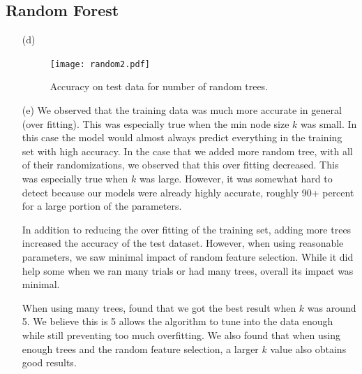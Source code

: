 \documentclass[a4paper]{article}
\begin{document}
\subsection{Random Forest}
\begin{enumerate}
	\item[(d)] $ $
	
	\begin{figure}[H]
		\begin{center}
			\texttt{[image: random2.pdf]}
			\caption{Accuracy on test data for number of random trees.}
		\end{center}
	\end{figure}
	
\item[(e)] We observed that the training data was much more accurate in general (over fitting). This was especially true when the min node size $k$ was small. In this case the model would almost always predict everything in the training set with high accuracy. In the case that we added more random tree, with all of their randomizations, we observed that this over fitting decreased. This was especially true when $k$ was large. However, it was somewhat hard to detect because our models were already highly accurate, roughly 90+ percent for a large portion of the parameters.

In addition to reducing the over fitting of the training set, adding more trees increased the accuracy of the test dataset. However, when using reasonable parameters, we saw minimal impact of random feature selection. While it did help some when we ran many trials or had many trees, overall its impact was minimal. 

When using many trees, found that we got the best result when $k$ was around 5. We believe this is 5 allows the algorithm to tune into the data enough while still preventing too much overfitting. We also found that when using enough trees and the random feature selection, a larger $k$ value also obtains good results.

	
\end{enumerate}
\end{document}
